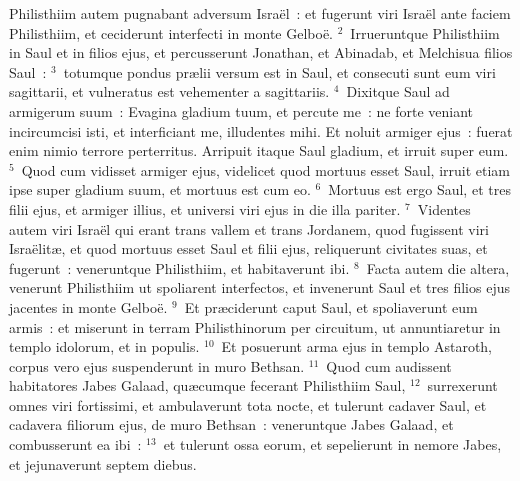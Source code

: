 \lettrine[lines=10,image=true,loversize=0.05,lraise=-0.03]{P}{}hilisthiim autem pugnabant adversum Isra\"el~: et fugerunt viri Isra\"el ante faciem Philisthiim, et ceciderunt interfecti in monte Gelbo\"e.
${}^{2}$~Irrueruntque Philisthiim in Saul et in filios ejus, et percusserunt Jonathan, et Abinadab, et Melchisua filios Saul~:
${}^{3}$~totumque pondus pr\ae lii versum est in Saul, et consecuti sunt eum viri sagittarii, et vulneratus est vehementer a sagittariis.
${}^{4}$~Dixitque Saul ad armigerum suum~: Evagina gladium tuum, et percute me~: ne forte veniant incircumcisi isti, et interficiant me, illudentes mihi. Et noluit armiger ejus~: fuerat enim nimio terrore perterritus. Arripuit itaque Saul gladium, et irruit super eum.
${}^{5}$~Quod cum vidisset armiger ejus, videlicet quod mortuus esset Saul, irruit etiam ipse super gladium suum, et mortuus est cum eo.
${}^{6}$~Mortuus est ergo Saul, et tres filii ejus, et armiger illius, et universi viri ejus in die illa pariter.
${}^{7}$~Videntes autem viri Isra\"el qui erant trans vallem et trans Jordanem, quod fugissent viri Isra\"elit\ae , et quod mortuus esset Saul et filii ejus, reliquerunt civitates suas, et fugerunt~: veneruntque Philisthiim, et habitaverunt ibi.
${}^{8}$~Facta autem die altera, venerunt Philisthiim ut spoliarent interfectos, et invenerunt Saul et tres filios ejus jacentes in monte Gelbo\"e.
${}^{9}$~Et pr\ae ciderunt caput Saul, et spoliaverunt eum armis~: et miserunt in terram Philisthinorum per circuitum, ut annuntiaretur in templo idolorum, et in populis.
${}^{10}$~Et posuerunt arma ejus in templo Astaroth, corpus vero ejus suspenderunt in muro Bethsan.
${}^{11}$~Quod cum audissent habitatores Jabes Galaad, qu\ae cumque fecerant Philisthiim Saul,
${}^{12}$~surrexerunt omnes viri fortissimi, et ambulaverunt tota nocte, et tulerunt cadaver Saul, et cadavera filiorum ejus, de muro Bethsan~: veneruntque Jabes Galaad, et combusserunt ea ibi~:
${}^{13}$~et tulerunt ossa eorum, et sepelierunt in nemore Jabes, et jejunaverunt septem diebus.
